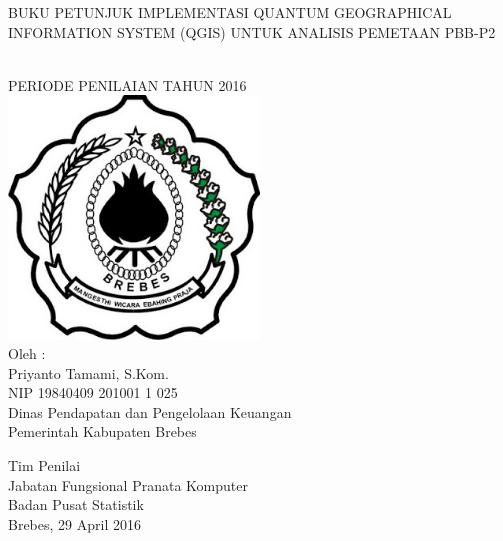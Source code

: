 \begin{titlepage}

\begin{center}
{\large BUKU PETUNJUK IMPLEMENTASI QUANTUM GEOGRAPHICAL INFORMATION SYSTEM (QGIS) UNTUK ANALISIS PEMETAAN PBB-P2}

\HRule\\[1cm]

PERIODE PENILAIAN TAHUN 2016\\[1cm]

\includegraphics[width=0.5\textwidth]{./resources/logo}\\[1cm]

Oleh :\\
Priyanto Tamami, S.Kom.\\
NIP 19840409 201001 1 025\\
Dinas Pendapatan dan Pengelolaan Keuangan\\
Pemerintah Kabupaten Brebes\\[1cm]

\vfill

Tim Penilai\\
Jabatan Fungsional Pranata Komputer\\
Badan Pusat Statistik\\
Brebes, 29 April 2016
\end{center}

\end{titlepage}